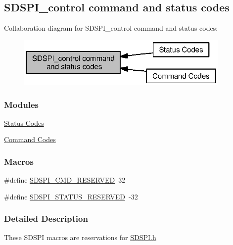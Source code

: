 \subsection{S\+D\+S\+P\+I\+\_\+control command and status codes}
\label{group___s_d_s_p_i___c_o_n_t_r_o_l}
Collaboration diagram for S\+D\+S\+P\+I\+\_\+control command and status codes\+:
\nopagebreak
\begin{figure}[H]
\begin{center}
\leavevmode
\includegraphics[width=295pt]{group___s_d_s_p_i___c_o_n_t_r_o_l}
\end{center}
\end{figure}
\subsubsection*{Modules}
\begin{DoxyCompactItemize}
\item 
\hyperlink{group___s_d_s_p_i___s_t_a_t_u_s}{Status Codes}
\item 
\hyperlink{group___s_d_s_p_i___c_m_d}{Command Codes}
\end{DoxyCompactItemize}
\subsubsection*{Macros}
\begin{DoxyCompactItemize}
\item 
\#define \hyperlink{group___s_d_s_p_i___c_o_n_t_r_o_l_ga2912b6627b0f64de874048a5ebea2a85}{S\+D\+S\+P\+I\+\_\+\+C\+M\+D\+\_\+\+R\+E\+S\+E\+R\+V\+E\+D}~32
\item 
\#define \hyperlink{group___s_d_s_p_i___c_o_n_t_r_o_l_ga3037f55e94a7ef536986738c721a690a}{S\+D\+S\+P\+I\+\_\+\+S\+T\+A\+T\+U\+S\+\_\+\+R\+E\+S\+E\+R\+V\+E\+D}~-\/32
\end{DoxyCompactItemize}


\subsubsection{Detailed Description}
These S\+D\+S\+P\+I macros are reservations for \hyperlink{_s_d_s_p_i_8h}{S\+D\+S\+P\+I.\+h} 

